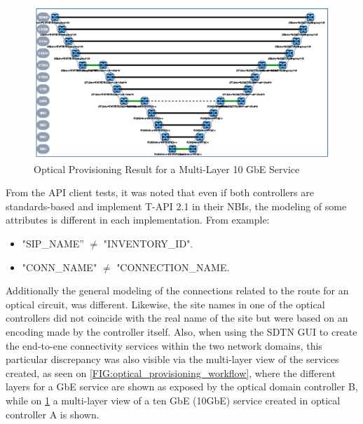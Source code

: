 \documentclass[a4paper,fleqn]{cas-dc}
\begin{document}
\begin{figure}
	\centering
		\includegraphics[width=\linewidth]{figs/optical_provisioning_result.png}
	\caption{Optical Provisioning Result for a Multi-Layer 10 GbE Service}
	\label{FIG:optical_provisioning_result}
\end{figure}

From the API client tests, it was noted that even if both controllers are standards-based and implement T-API 2.1 in their NBIs, the modeling of some attributes is different in each implementation. From example:
\begin{itemize}
    \item "SIP\_NAME” $\neq$ "INVENTORY\_ID". 
    \item "CONN\_NAME" $\neq$ "CONNECTION\_NAME. 
\end{itemize}

Additionally the general modeling of the connections related to the route for an optical circuit, was different. Likewise, the site names in one of the optical controllers did not coincide with the real name of the site but were based on an encoding made by the controller itself. Also, when using the SDTN GUI to create the end-to-ene connectivity services within the two network domains, this particular discrepancy was also visible via the multi-layer view of the services created, as seen on \cref{FIG:optical_provisioning_workflow}, where the different layers for a GbE service are shown as exposed by the optical domain controller B, while on \cref{FIG:optical_provisioning_result} a multi-layer view of a ten GbE (10GbE) service created in optical controller A is shown.
\end{document}
